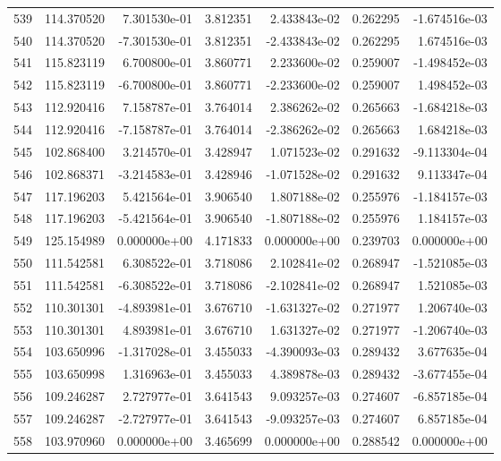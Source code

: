 \begin{tabular}{rrrrrrr}
 539 & 114.370520 &  7.301530e-01 &  3.812351 &  2.433843e-02 &   0.262295 & -1.674516e-03 \\
 540 & 114.370520 & -7.301530e-01 &  3.812351 & -2.433843e-02 &   0.262295 &  1.674516e-03 \\
 541 & 115.823119 &  6.700800e-01 &  3.860771 &  2.233600e-02 &   0.259007 & -1.498452e-03 \\
 542 & 115.823119 & -6.700800e-01 &  3.860771 & -2.233600e-02 &   0.259007 &  1.498452e-03 \\
 543 & 112.920416 &  7.158787e-01 &  3.764014 &  2.386262e-02 &   0.265663 & -1.684218e-03 \\
 544 & 112.920416 & -7.158787e-01 &  3.764014 & -2.386262e-02 &   0.265663 &  1.684218e-03 \\
 545 & 102.868400 &  3.214570e-01 &  3.428947 &  1.071523e-02 &   0.291632 & -9.113304e-04 \\
 546 & 102.868371 & -3.214583e-01 &  3.428946 & -1.071528e-02 &   0.291632 &  9.113347e-04 \\
 547 & 117.196203 &  5.421564e-01 &  3.906540 &  1.807188e-02 &   0.255976 & -1.184157e-03 \\
 548 & 117.196203 & -5.421564e-01 &  3.906540 & -1.807188e-02 &   0.255976 &  1.184157e-03 \\
 549 & 125.154989 &  0.000000e+00 &  4.171833 &  0.000000e+00 &   0.239703 &  0.000000e+00 \\
 550 & 111.542581 &  6.308522e-01 &  3.718086 &  2.102841e-02 &   0.268947 & -1.521085e-03 \\
 551 & 111.542581 & -6.308522e-01 &  3.718086 & -2.102841e-02 &   0.268947 &  1.521085e-03 \\
 552 & 110.301301 & -4.893981e-01 &  3.676710 & -1.631327e-02 &   0.271977 &  1.206740e-03 \\
 553 & 110.301301 &  4.893981e-01 &  3.676710 &  1.631327e-02 &   0.271977 & -1.206740e-03 \\
 554 & 103.650996 & -1.317028e-01 &  3.455033 & -4.390093e-03 &   0.289432 &  3.677635e-04 \\
 555 & 103.650998 &  1.316963e-01 &  3.455033 &  4.389878e-03 &   0.289432 & -3.677455e-04 \\
 556 & 109.246287 &  2.727977e-01 &  3.641543 &  9.093257e-03 &   0.274607 & -6.857185e-04 \\
 557 & 109.246287 & -2.727977e-01 &  3.641543 & -9.093257e-03 &   0.274607 &  6.857185e-04 \\
 558 & 103.970960 &  0.000000e+00 &  3.465699 &  0.000000e+00 &   0.288542 &  0.000000e+00 \\

\end{tabular}
